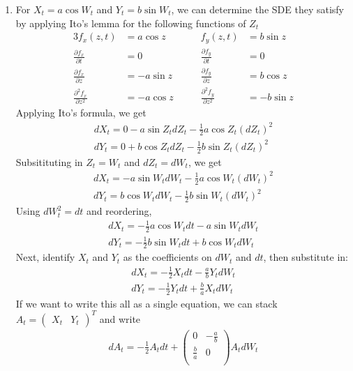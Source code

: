 \documentclass[12pt]{article}
\theoremstyle{plain}
\theoremstyle{definition}
\theoremstyle{remark}
\begin{document}
\begin{enumerate}
\begin{enumerate}
      \item %
        For $X_t = a \cos W_t$ and $Y_t = b \sin W_t$, we can determine
        the SDE they satisfy by applying Ito's lemma for the following
        functions of $Z_t$
        \begin{alignat*}{3}
          f_x(z,t) &= a\cos z \qquad & f_y(z,t) &= b \sin z \\
          \frac{\partial f_x}{\partial t}
            &= 0
            \qquad &
          \frac{\partial f_y}{\partial t}
            &= 0 \\
          \frac{\partial f_x}{\partial z}
            &= -a\sin z
            \qquad &
          \frac{\partial f_y}{\partial z}
            &= b\cos z \\
          \frac{\partial^2 f_x}{\partial z^2}
            &= -a\cos z
            \qquad &
          \frac{\partial^2 f_y}{\partial z^2}
            &= -b\sin z
        \end{alignat*}
        Applying Ito's formula, we get
        \begin{align*}
          dX_t = 0 - a \sin Z_t dZ_t - \frac{1}{2} a\cos Z_t (dZ_t)^2\\
          dY_t = 0 + b \cos Z_t dZ_t - \frac{1}{2} b\sin Z_t (dZ_t)^2
        \end{align*}
        Subsitituting in $Z_t = W_t$ and $dZ_t = dW_t$, we get
        \begin{align*}
          dX_t = - a \sin W_t dW_t - \frac{1}{2} a\cos W_t (dW_t)^2\\
          dY_t =   b \cos W_t dW_t - \frac{1}{2} b\sin W_t (dW_t)^2
        \end{align*}
        Using $dW_t^2 = dt$ and reordering,
        \begin{align*}
          dX_t = - \frac{1}{2} a\cos W_t dt - a \sin W_t dW_t  \\
          dY_t = - \frac{1}{2} b\sin W_t dt + b \cos W_t dW_t
        \end{align*}
        Next, identify $X_t$ and $Y_t$ as the coefficients on $dW_t$ and
        $dt$, then substitute in:
        \begin{align*}
          dX_t = - \frac{1}{2} X_t dt - \frac{a}{b} Y_t dW_t  \\
          dY_t = - \frac{1}{2} Y_t dt + \frac{b}{a} X_t dW_t
        \end{align*}
        If we want to write this all as a single equation, we can stack
        $A_t = \begin{pmatrix} X_t & Y_t \end{pmatrix}^T$ and write
        \begin{align*}
          dA_t = - \frac{1}{2} A_t dt
            + \begin{pmatrix}
              0 & -\frac{a}{b} \\
              \frac{b}{a} & 0  \\
              \end{pmatrix}
              A_t dW_t
        \end{align*}


\end{enumerate}
\end{enumerate}
\end{document}
